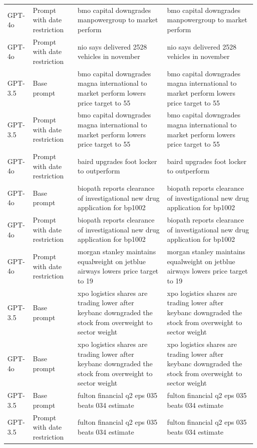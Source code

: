 \begin{longtable}{>{\raggedright\arraybackslash}p{1.4cm}>{\raggedright\arraybackslash}p{1.4cm}>{\raggedright\arraybackslash}p{5.5cm}>{\raggedright\arraybackslash}p{5.5cm}}
GPT-4o & Prompt with date restriction & bmo capital downgrades manpowergroup to market perform & bmo capital downgrades manpowergroup to market perform\\
GPT-4o & Prompt with date restriction & nio says delivered 2528 vehicles in november & nio says delivered 2528 vehicles in november\\
GPT-3.5 & Base prompt & bmo capital downgrades magna international to market perform lowers price target to 55 & bmo capital downgrades magna international to market perform lowers price target to 55\\
GPT-3.5 & Prompt with date restriction & bmo capital downgrades magna international to market perform lowers price target to 55 & bmo capital downgrades magna international to market perform lowers price target to 55\\
GPT-4o & Prompt with date restriction & baird upgrades foot locker to outperform & baird upgrades foot locker to outperform\\
GPT-4o & Base prompt & biopath reports clearance of investigational new drug application for bp1002 & biopath reports clearance of investigational new drug application for bp1002\\
GPT-4o & Prompt with date restriction & biopath reports clearance of investigational new drug application for bp1002 & biopath reports clearance of investigational new drug application for bp1002\\
GPT-4o & Prompt with date restriction & morgan stanley maintains equalweight on jetblue airways lowers price target to 19 & morgan stanley maintains equalweight on jetblue airways lowers price target to 19\\
GPT-3.5 & Base prompt & xpo logistics shares are trading lower after keybanc downgraded the stock from overweight to sector weight & xpo logistics shares are trading lower after keybanc downgraded the stock from overweight to sector weight\\
GPT-4o & Base prompt & xpo logistics shares are trading lower after keybanc downgraded the stock from overweight to sector weight & xpo logistics shares are trading lower after keybanc downgraded the stock from overweight to sector weight\\
GPT-3.5 & Base prompt & fulton financial q2 eps 035 beats 034 estimate & fulton financial q2 eps 035 beats 034 estimate\\
GPT-3.5 & Prompt with date restriction & fulton financial q2 eps 035 beats 034 estimate & fulton financial q2 eps 035 beats 034 estimate\\

\end{longtable}
